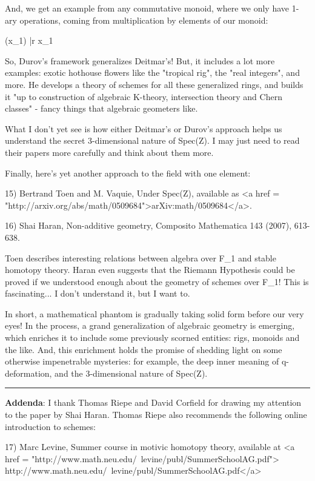 And, we get an example from any commutative monoid, where we only
have 1-ary operations, coming from multiplication by elements of
our monoid:

(x_{1}) |\to  r x_{1}

So, Durov's framework generalizes Deitmar's!  But, it includes a lot
more examples: exotic hothouse flowers like the "tropical rig", the
"real integers", and more.  He develops a theory of schemes for all
these generalized rings, and builds it "up to construction of algebraic 
K-theory, intersection theory and Chern classes" - fancy things that
algebraic geometers like.

What I don't yet see is how either Deitmar's or Durov's approach
helps us understand the secret 3-dimensional nature of Spec(Z).  
I may just need to read their papers more carefully and think about
them more.

Finally, here's yet another approach to the field with one element:

15) Bertrand Toen and M. Vaquie, Under Spec(Z), available as 
<a href = "http://arxiv.org/abs/math/0509684">arXiv:math/0509684</a>.

16) Shai Haran, Non-additive geometry, Composito Mathematica 143
(2007), 613-638.  

Toen describes interesting relations between algebra over F_{1} and
stable homotopy theory.  Haran even suggests that the Riemann
Hypothesis could be proved if we understood enough about the geometry
of schemes over F_{1}!  This is fascinating... I don't understand it,
but I want to.

In short, a mathematical phantom is gradually taking solid form before our
very eyes!   In the process, a grand generalization of algebraic geometry
is emerging, which enriches it to include some previously scorned 
entities: rigs, monoids and the like.  And, this enrichment 
holds the promise of shedding light on some otherwise impenetrable
mysteries: for example, the deep inner meaning of 
q-deformation, and the 3-dimensional nature of Spec(Z).


\par\noindent\rule{\textwidth}{0.4pt}
\textbf{Addenda}: I thank Thomas Riepe and David Corfield for drawing my
attention to the paper by Shai Haran.  Thomas Riepe also recommends
the following online introduction to schemes:

17) Marc Levine, Summer course in motivic homotopy theory, available at 
<a href = "http://www.math.neu.edu/~levine/publ/SummerSchoolAG.pdf">
http://www.math.neu.edu/~levine/publ/SummerSchoolAG.pdf</a>

